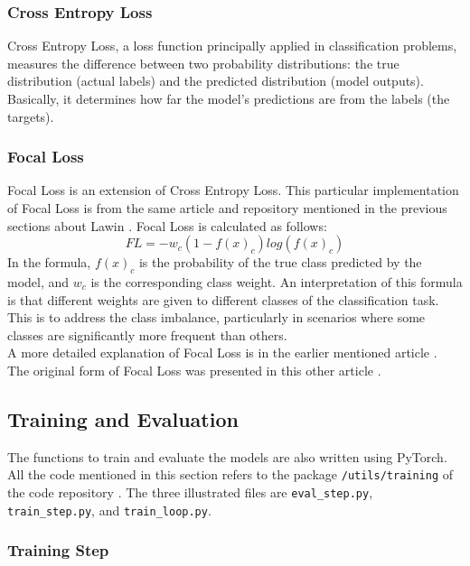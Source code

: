 \subsubsection{Cross Entropy Loss}

Cross Entropy Loss, a loss function principally applied in classification problems, measures the difference between two probability distributions: the true distribution (actual labels) and the predicted distribution (model outputs).
Basically, it determines how far the model's predictions are from the labels (the targets).

\subsubsection{Focal Loss}

Focal Loss is an extension of Cross Entropy Loss. This particular implementation of Focal Loss is from the same article and repository mentioned in the previous sections about Lawin \cite{WeedMap-PaperThesis} \cite{WeedMap-Repository}.
Focal Loss is calculated as follows:
\begin{equation}
	FL=-w_c (1-f(x)_c ) log(f(x)_c)
\end{equation}
In the formula, $f(x)_c$ is the probability of the true class predicted by the model, and $w_c$ is the corresponding class weight.
An interpretation of this formula is that different weights are given to different classes of the classification task. This is to address the class imbalance, particularly in scenarios where some classes are significantly more frequent than others.
\\[0.3cm]A more detailed explanation of Focal Loss is in the earlier mentioned article \cite{WeedMap-PaperThesis}. The original form of Focal Loss was presented in this other article \cite{FocalLoss}.

\subsection{Training and Evaluation}

The functions to train and evaluate the models are also written using PyTorch.
\\[0.3cm]All the code mentioned in this section refers to the package \texttt{/utils/training} of the code repository \cite{Repository-THESIS}. The three illustrated files are \texttt{eval\_step.py}, \texttt{train\_step.py}, and \texttt{train\_loop.py}.

\subsubsection{Training Step}

